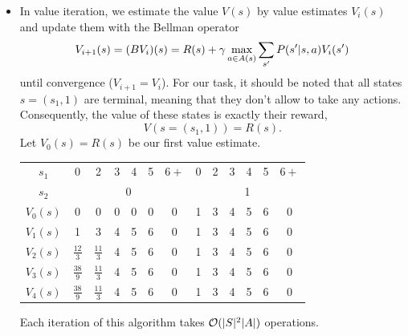 \documentclass[11pt, a4paper]{article}
\begin{document}
\begin{enumerate}
\begin{solution}
        \begin{itemize}
            \item In value iteration, we estimate the value $V(s)$ by value estimates $V_i(s)$ and update them with the Bellman operator
            \begin{equation*}
                V_{i+1}(s) = (B V_i)(s) = R(s) + \gamma \max_{a \in A(s)} \sum_{s'} P(s' \vert s, a) V_{i}(s')
            \end{equation*}
            until convergence ($V_{i + 1} = V_i$). For our task, it should be noted that all states $s = (s_1, 1)$ are terminal, meaning that they don't allow to take any actions. Consequently, the value of these states is exactly their reward, \ie{}
            \begin{equation*}
                V(s = (s_1, 1)) = R(s) .
            \end{equation*}
            Let $V_0(s) = R(s)$ be our first value estimate.
            
            \begin{table}[H]
                \centering
                \begin{tabular}{c|cccccc|cccccc}
                    \toprule
                    $s_1$    & 0 & 2 & 3 & 4 & 5 & $6+$ & 0 & 2 & 3 & 4 & 5 & $6+$ \\
                    $s_2$    & \multicolumn{6}{c|}{0}   & \multicolumn{6}{c}{1}    \\
                    \midrule
                    $V_0(s)$ & 0 & 0 & 0 & 0 & 0 & 0    & 1 & 3 & 4 & 5 & 6 & 0    \\
                    $V_1(s)$ & 1 & 3 & 4 & 5 & 6 & 0    & 1 & 3 & 4 & 5 & 6 & 0    \\
                    $V_2(s)$ & $\frac{12}{3}$ & $\frac{11}{3}$ & 4 & 5 & 6 & 0 & 1 & 3 & 4 & 5 & 6 & 0 \\
                    $V_3(s)$ & $\frac{38}{9}$ & $\frac{11}{3}$ & 4 & 5 & 6 & 0 & 1 & 3 & 4 & 5 & 6 & 0 \\
                    $V_4(s)$ & $\frac{38}{9}$ & $\frac{11}{3}$ & 4 & 5 & 6 & 0 & 1 & 3 & 4 & 5 & 6 & 0 \\
                    \bottomrule
                \end{tabular}
            \end{table}

            Each iteration of this algorithm takes $\mathcal{O}(\lvert S\rvert^2 \lvert A\rvert)$ operations. 
            

\end{itemize}
\end{solution}
\end{enumerate}
\end{document}
